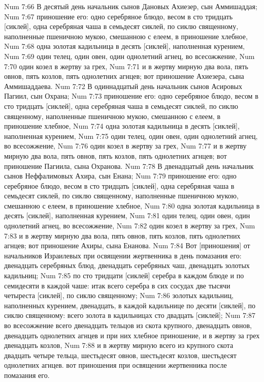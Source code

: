Num 7:66  В десятый день начальник сынов Дановых Ахиезер, сын Аммишаддая;
Num 7:67  приношение его: одно серебряное блюдо, весом в сто тридцать [сиклей], одна серебряная чаша в семьдесят сиклей, по сиклю священному, наполненные пшеничною мукою, смешанною с елеем, в приношение хлебное,
Num 7:68  одна золотая кадильница в десять [сиклей], наполненная курением,
Num 7:69  один телец, один овен, один однолетний агнец, во всесожжение,
Num 7:70  один козел в жертву за грех,
Num 7:71  и в жертву мирную два вола, пять овнов, пять козлов, пять однолетних агнцев; вот приношение Ахиезера, сына Аммишаддаева.
Num 7:72  В одиннадцатый день начальник сынов Асировых Пагиил, сын Охрана;
Num 7:73  приношение его: одно серебряное блюдо, весом в сто тридцать [сиклей], одна серебряная чаша в семьдесят сиклей, по сиклю священному, наполненные пшеничною мукою, смешанною с елеем, в приношение хлебное,
Num 7:74  одна золотая кадильница в десять [сиклей], наполненная курением,
Num 7:75  один телец, один овен, один однолетний агнец, во всесожжение,
Num 7:76  один козел в жертву за грех,
Num 7:77  и в жертву мирную два вола, пять овнов, пять козлов, пять однолетних агнцев; вот приношение Пагиила, сына Охранова.
Num 7:78  В двенадцатый день начальник сынов Неффалимовых Ахира, сын Енана;
Num 7:79  приношение его: одно серебряное блюдо, весом в сто тридцать [сиклей], одна серебряная чаша в семьдесят сиклей, по сиклю священному, наполненные пшеничною мукою, смешанною с елеем, в приношение хлебное,
Num 7:80  одна золотая кадильница в десять [сиклей], наполненная курением,
Num 7:81  один телец, один овен, один однолетний агнец, во всесожжение,
Num 7:82  один козел в жертву за грех,
Num 7:83  и в жертву мирную два вола, пять овнов, пять козлов, пять однолетних агнцев; вот приношение Ахиры, сына Енанова.
Num 7:84  Вот [приношения] от начальников Израилевых при освящении жертвенника в день помазания его: двенадцать серебряных блюд, двенадцать серебряных чаш, двенадцать золотых кадильниц;
Num 7:85  по сто тридцати [сиклей] серебра в каждом блюде и по семидесяти в каждой чаше: итак всего серебра в сих сосудах две тысячи четыреста [сиклей], по сиклю священному;
Num 7:86  золотых кадильниц, наполненных курением, двенадцать, в каждой кадильнице по десяти [сиклей], по сиклю священному: всего золота в кадильницах сто двадцать [сиклей];
Num 7:87  во всесожжение всего двенадцать тельцов из скота крупного, двенадцать овнов, двенадцать однолетних агнцев и при них хлебное приношение, и в жертву за грех двенадцать козлов,
Num 7:88  и в жертву мирную всего из крупного скота двадцать четыре тельца, шестьдесят овнов, шестьдесят козлов, шестьдесят однолетних агнцев. вот приношения при освящении жертвенника после помазания его.
